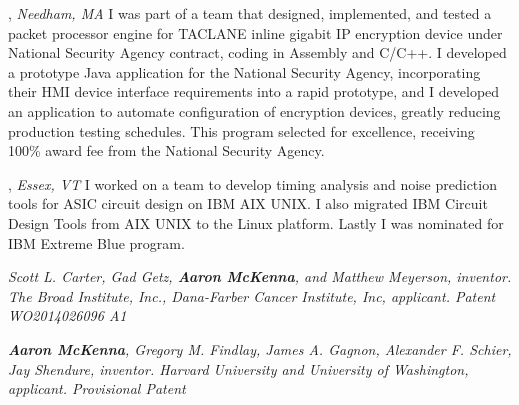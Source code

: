 \documentclass[9pt]{article}
\begin{document}
, \emph{Needham, MA} \vspace{0.01in} 
\newline{}
\newline
\newline\noindent I was part of a team that designed, implemented, and tested a packet processor engine for TACLANE inline gigabit IP encryption device under National Security Agency contract, coding in Assembly and C/C++. I developed a prototype Java application for the National Security Agency, incorporating their HMI device interface requirements into a rapid prototype, and I developed an application to automate configuration of encryption devices, greatly reducing production testing schedules. This program selected for excellence, receiving 100\% award fee from the National Security Agency.\bigskip


, \emph{Essex, VT} \vspace{0.01in} 
\newline{}
\newline
\newline\noindent I worked on a team to develop timing analysis and noise prediction tools for ASIC circuit design on IBM AIX UNIX. I also migrated IBM Circuit Design Tools from AIX UNIX to the Linux platform. Lastly I was nominated for IBM Extreme Blue program.\bigskip

\bigskip

\medskip
{}
\newline\noindent\emph{Scott L. Carter, Gad Getz, \textbf{Aaron McKenna}, and Matthew Meyerson, inventor. The Broad Institute, Inc., Dana-Farber Cancer Institute, Inc, applicant. Patent WO2014026096 A1}

\medskip
{}\newline\noindent\emph{\textbf{Aaron McKenna}, Gregory M. Findlay, James A. Gagnon, Alexander F. Schier, Jay Shendure, inventor. Harvard University and University of Washington, applicant. Provisional Patent}
\end{document}
